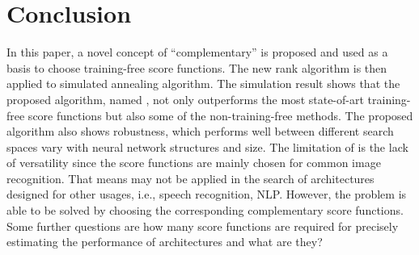 \documentclass[sigconf]{acmart}
\begin{document}
    \section{Conclusion}
    \label{sec:conclusion}
    In this paper, a novel concept of ``complementary'' is proposed and used as a basis to choose 
    training-free score functions. The new rank algorithm is then applied to simulated annealing 
    algorithm. The simulation result shows that the proposed algorithm, named \palg{}, not only outperforms the most 
    state-of-art training-free score functions but also some of the non-training-free methods. 
    The proposed algorithm also shows robustness, which performs well between different search 
    spaces vary with neural network structures and size. 
    The limitation of \palg{} is the lack of versatility since the score functions are mainly chosen 
    for common image recognition. That means \palg{} may not be applied in the search of architectures 
    designed for other usages, i.e., speech recognition, NLP. However, the problem is able to be solved 
    by choosing the corresponding complementary score functions. Some further questions are how many 
    score functions are required for precisely estimating the performance of architectures and what are they? 
    
    
    
\end{document}
